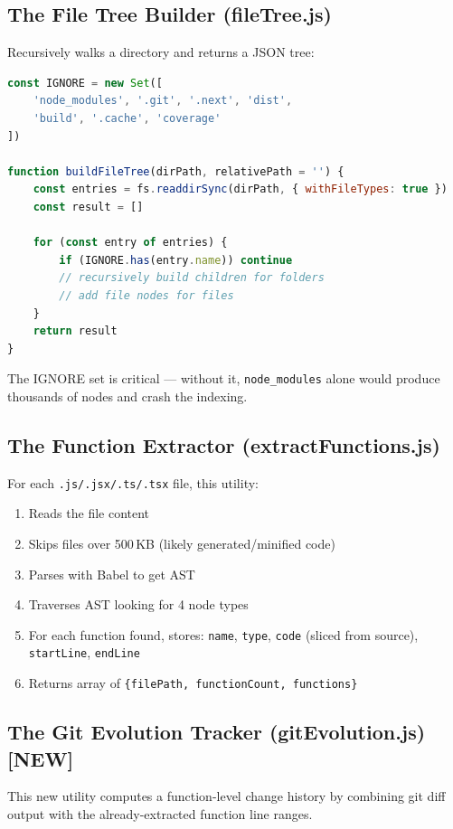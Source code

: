 \documentclass[a4paper,11pt]{article}
\begin{document}
\subsection{The File Tree Builder (fileTree.js)}

Recursively walks a directory and returns a JSON tree:
\begin{lstlisting}[language=JavaScript]
const IGNORE = new Set([
    'node_modules', '.git', '.next', 'dist',
    'build', '.cache', 'coverage'
])

function buildFileTree(dirPath, relativePath = '') {
    const entries = fs.readdirSync(dirPath, { withFileTypes: true })
    const result = []
    
    for (const entry of entries) {
        if (IGNORE.has(entry.name)) continue
        // recursively build children for folders
        // add file nodes for files
    }
    return result
}
\end{lstlisting}

The IGNORE set is critical --- without it, \texttt{node\_modules} alone would produce thousands of nodes and crash the indexing.

\subsection{The Function Extractor (extractFunctions.js)}

For each \texttt{.js/.jsx/.ts/.tsx} file, this utility:
\begin{enumerate}
    \item Reads the file content
    \item Skips files over 500\,KB (likely generated/minified code)
    \item Parses with Babel to get AST
    \item Traverses AST looking for 4 node types
    \item For each function found, stores: \texttt{name}, \texttt{type}, \texttt{code} (sliced from source), \texttt{startLine}, \texttt{endLine}
    \item Returns array of \texttt{\{filePath, functionCount, functions\}}
\end{enumerate}

\subsection{The Git Evolution Tracker (gitEvolution.js) \textbf{[NEW]}}

This new utility computes a function-level change history by combining git diff output with the already-extracted function line ranges.
\end{document}
